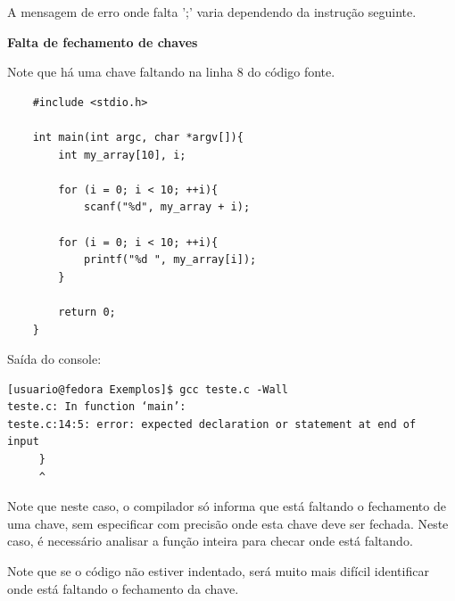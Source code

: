 \documentclass[12pt]{article}
\newcommand\tab[1][1cm]{\hspace*{#1}}
\begin{document}
\hspace{0.25cm}
\begin{tcolorbox}[colback=yellow!5!white,colframe=yellow!75!black,title=Atenção!]
  \par\tab A mensagem de erro onde falta ';' varia dependendo da instrução seguinte.
\end{tcolorbox}

\hspace{2cm}
\par\tab\textbf{Falta de fechamento de chaves}

\par\tab Note que há uma chave faltando na linha 8 do código fonte.

\hspace{0.25cm}
\begin{lstlisting}
    #include <stdio.h>
    
    int main(int argc, char *argv[]){
        int my_array[10], i;
        
        for (i = 0; i < 10; ++i){
            scanf("%d", my_array + i);
        
        for (i = 0; i < 10; ++i){
            printf("%d ", my_array[i]);
        }
        
        return 0;
    }
\end{lstlisting}

\par\tab Saída do console:

\hspace{0.25cm}
\begin{tcolorbox}[colback=black!5!white,colframe=black!75!white,title=Console: usuario@fedora:\~/Exemplos]
    \begin{verbatim}
[usuario@fedora Exemplos]$ gcc teste.c -Wall
teste.c: In function ‘main’:
teste.c:14:5: error: expected declaration or statement at end of
input
     }
     ^
    \end{verbatim}
\end{tcolorbox}

\par\tab Note que neste caso, o compilador só informa que está faltando o fechamento de uma chave, sem especificar com precisão onde esta chave deve ser fechada. Neste caso, é necessário analisar a função inteira para checar onde está faltando.

\hspace{0.25cm}
\begin{tcolorbox}[colback=yellow!5!white,colframe=yellow!75!black,title=Atenção!]
  \par\tab Note que se o código não estiver indentado, será muito mais difícil identificar onde está faltando o fechamento da chave.
\end{tcolorbox}
\end{document}
